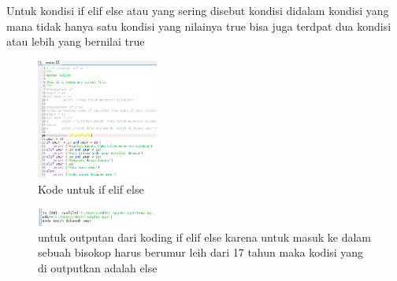 \begin{enumerate}
\hfill \break
Untuk kondisi if elif else atau yang sering disebut kondisi didalam kondisi yang mana tidak hanya satu kondisi yang nilainya true bisa juga terdpat dua kondisi atau lebih yang bernilai true
\begin{figure}[H]
		\includegraphics[width=4cm]{figures/1184065/IF_ELIF_ELSE.PNG}
		\centering
		\caption{Kode untuk if elif else}
\end{figure}
\begin{figure}[H]
		\includegraphics[width=4cm]{figures/1184065/IF_ELIF_ELSE_HASIL.PNG}
		\centering
		\caption{untuk outputan dari koding if elif else karena untuk masuk ke dalam sebuah bisokop harus berumur leih dari 17 tahun maka kodisi  yang di outputkan adalah else}
\end{figure}
\hfill \break
\end{enumerate}

